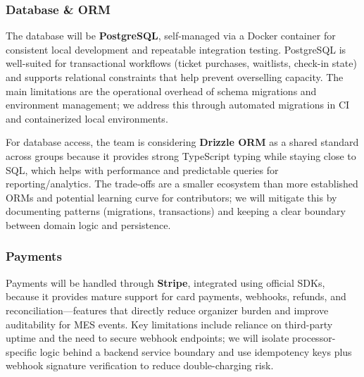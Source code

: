 \documentclass{article}
\begin{document}
\subsubsection*{Database \& ORM} 
The database will be \textbf{PostgreSQL}, self-managed via a Docker container for consistent local development and repeatable integration testing. PostgreSQL is well-suited for transactional workflows (ticket purchases, waitlists, check-in state) and supports relational constraints that help prevent overselling capacity. The main limitations are the operational overhead of schema migrations and environment management; we address this through automated migrations in CI and containerized local environments.

For database access, the team is considering \textbf{Drizzle ORM} as a shared standard across groups because it provides strong TypeScript typing while staying close to SQL, which helps with performance and predictable queries for reporting/analytics. The trade-offs are a smaller ecosystem than more established ORMs and potential learning curve for contributors; we will mitigate this by documenting patterns (migrations, transactions) and keeping a clear boundary between domain logic and persistence.

\subsubsection*{Payments} 
Payments will be handled through \textbf{Stripe}, integrated using official SDKs, because it provides mature support for card payments, webhooks, refunds, and reconciliation---features that directly reduce organizer burden and improve auditability for MES events. Key limitations include reliance on third-party uptime and the need to secure webhook endpoints; we will isolate processor-specific logic behind a backend service boundary and use idempotency keys plus webhook signature verification to reduce double-charging risk.
\end{document}
